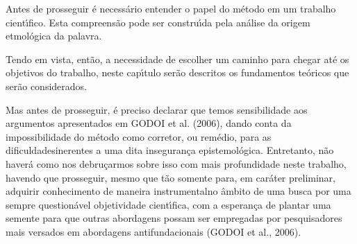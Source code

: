 \documentclass[
12pt,		%
openright,	%
twoside,  %
a4paper,			%
chapter=TITLE,		%
english,			%
french,				%
spanish,			%
brazil				%
]{USPSC-classe/USPSC}
\begin{document}
Antes de prosseguir \'e necess\'ario entender o papel do m\'etodo em um trabalho cient\'{\i}fico. Esta compreens\~ao pode ser constru\'{\i}da pela an\'alise da origem etmol\'ogica da palavra.











\noindent\begin{center}\mbox{\centering{}}\end{center}


Tendo em vista, ent\~ao, a necessidade de escolher um caminho para chegar at\'e os objetivos do trabalho, neste cap\'{\i}tulo ser\~ao descritos os fundamentos te\'oricos que ser\~ao considerados.










Mas antes de prosseguir, \'e preciso declarar que temos sensibilidade aos argumentos apresentados em  GODOI et al. (2006), dando conta da impossibilidade \textquotedbl do m\'etodo como corretor, ou rem\'edio, para as dificuldades\textquotedbl  inerentes a uma dita \textquotedbl inseguran\c{c}a epistemol\'ogica\textquotedbl . Entretanto, n\~ao haver\'a como nos debru\c{c}armos sobre isso com mais profundidade neste trabalho, havendo que prosseguir, mesmo que t\~ao somente para, em car\'ater preliminar, \textquotedbl adquirir conhecimento de maneira instrumental\textquotedbl  no \^ambito de uma busca por uma sempre question\'avel \textquotedbl objetividade cient\'{\i}fica\textquotedbl , com a esperan\c{c}a de plantar uma semente para que outras abordagens possam ser empregadas por  pesquisadores mais versados em abordagens antifundacionais  (GODOI et al., 2006).
\end{document}
